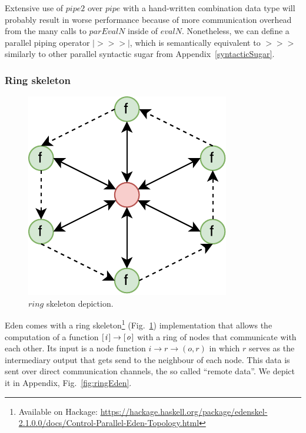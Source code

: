 \documentclass{jfp1}
\newcommand{\Varid}[1]{\mathit{#1}}
\begin{document}
Extensive use of \ensuremath{\Varid{pipe2}} over \ensuremath{\Varid{pipe}} with a hand-written combination data type will probably result in worse performance because of more communication overhead from the many calls to \ensuremath{\Varid{parEvalN}} inside of \ensuremath{\Varid{evalN}}. Nonetheless, we can define a parallel piping operator \ensuremath{\mathbin{|\!>\!\!>\!\!>\!|}}, which is semantically equivalent to \ensuremath{\mathbin{>\!\!>\!\!>}} similarly to other parallel syntactic sugar from Appendix~\ref{syntacticSugar}.



\subsubsection{Ring skeleton} \label{sec:ring}
\begin{figure}[tb]
	\includegraphics[scale=0.75]{images/ring}
	\caption{\ensuremath{\Varid{ring}} skeleton depiction.}
	\label{fig:ringImg}
\end{figure}
Eden comes with a ring skeleton\footnote{Available on Hackage: \url{https://hackage.haskell.org/package/edenskel-2.1.0.0/docs/Control-Parallel-Eden-Topology.html}} (Fig.~\ref{fig:ringImg}) implementation that allows the computation of a function \ensuremath{[\mskip1.5mu \Varid{i}\mskip1.5mu]\to [\mskip1.5mu \Varid{o}\mskip1.5mu]} with a ring of nodes that communicate with each other. Its input is a node function \ensuremath{\Varid{i}\to \Varid{r}\to (\Varid{o},\Varid{r})} in which \ensuremath{\Varid{r}} serves as the intermediary output that gets send to the neighbour of each node. This data is sent over direct communication channels, the so called \enquote{remote data}. We depict it in Appendix, Fig.~\ref{fig:ringEden}.
\end{document}

